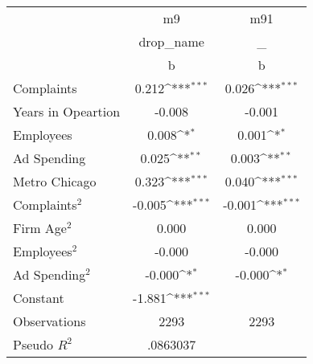 {
\def\sym#1{\ifmmode^{#1}\else\(^{#1}\)\fi}
\begin{tabular}{l*{2}{c}}
\toprule
                    &          m9         &         m91         \\
                    &   drop\_name         &           \_         \\
                    &           b         &           b         \\
\midrule
Complaints          &       0.212\sym{***}&       0.026\sym{***}\\
Years in Opeartion  &      -0.008         &      -0.001         \\
Employees           &       0.008\sym{*}  &       0.001\sym{*}  \\
Ad Spending         &       0.025\sym{**} &       0.003\sym{**} \\
Metro Chicago       &       0.323\sym{***}&       0.040\sym{***}\\
Complaints$^{2}$    &      -0.005\sym{***}&      -0.001\sym{***}\\
Firm Age$^{2}$      &       0.000         &       0.000         \\
Employees$^{2}$     &      -0.000         &      -0.000         \\
Ad Spending$^{2}$   &      -0.000\sym{*}  &      -0.000\sym{*}  \\
Constant            &      -1.881\sym{***}&                     \\
\midrule
Observations        &        2293         &        2293         \\
Pseudo \(R^{2}\)    &    .0863037         &                     \\
\bottomrule
\end{tabular}
}
